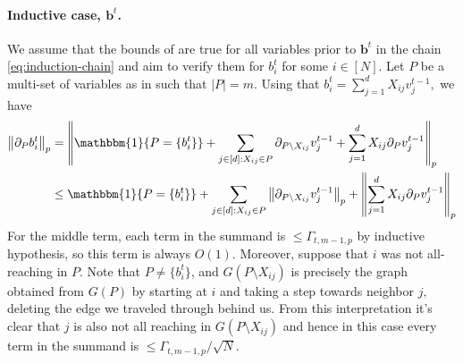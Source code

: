 \documentclass{article}
\newcommand{\1}{\mathbbm{1}}
\newcommand{\norm}[1]{\left\lVert#1\right\rVert}
\theoremstyle{plain}
\theoremstyle{definition}
\theoremstyle{remark}
\newcommand{\bfb}{\boldsymbol{b}}
\begin{document}
\paragraph{Inductive case, $\bfb^t$.} We assume that the bounds of  are true for all variables prior to $\bfb^{t}$ in the chain \eqref{eq:induction-chain} and aim to verify them for $b^{t}_i$ for some $i \in [N].$ Let $P$ be a multi-set of variables as in  such that $|P|=m.$ Using that $b_i^{t} =\sum_{j=1}^d X_{ij}v_j^{t-1},$ we have
\begin{align}
    \norm{\partial_P b_i^t}_p &= \norm{\1\{P = \{b_i^t\}\} + \sum_{\substack{j\in [d]: X_{ij}\in P}} \partial_{P\setminus X_{ij}} v^{t-1}_j + \sum_{j=1}^d X_{ij}\partial_P v_j^{t-1}}_p  \nonumber\\
    &\leq \1\{P = \{b_i^t\}\} + \sum_{\substack{j\in [d]: X_{ij}\in P}} \norm{\partial_{P\setminus X_{ij}} v^{t-1}_j }_p+ \norm{\sum_{j=1}^d X_{ij}\partial_P v_j^{t-1}}_p \label{eq:expansion-h}
\end{align}
For the middle term, each term in the summand is $\leq \Gamma_{t,m-1,p}$ by inductive hypothesis, so this term is always $O(1).$ Moreover, suppose that $i$ was not all-reaching in $P$. Note that $P \neq \{b_i^t\}$, and $G(P\setminus X_{ij})$ is precisely the graph obtained from $G(P)$ by starting at $i$ and taking a step towards neighbor $j,$ deleting the edge we traveled through behind us. From this interpretation it's clear that $j$ is also not all reaching in $G(P\setminus X_{ij})$ and hence in this case every term in the summand is $\leq \Gamma_{t,m-1,p}/\sqrt{N}$. 
\end{document}
